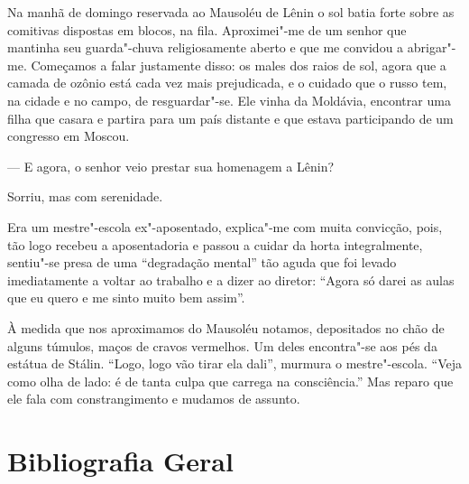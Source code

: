 Na manhã de domingo reservada ao Mausoléu de Lênin o sol batia forte sobre as comitivas dispostas em blocos, na fila. Aproximei"-me de um senhor que mantinha seu guarda"-chuva religiosamente aberto e que me convidou a abrigar"-me. Começamos a falar justamente disso: os males dos raios de sol, agora que a camada de ozônio está cada vez mais prejudicada, e o cuidado que o russo tem, na cidade e no campo, de resguardar"-se. Ele vinha da Moldávia, encontrar uma filha que casara e partira para um país distante e que estava participando de um congresso em Moscou.

--- E agora, o senhor veio prestar sua homenagem a Lênin?

Sorriu, mas com serenidade.

Era um mestre"-escola ex"-aposentado, explica"-me com muita convicção, pois, tão logo recebeu a aposentadoria e passou a cuidar da horta integralmente, sentiu"-se presa de uma ``degradação mental'' tão aguda que foi levado imediatamente a voltar ao trabalho e a dizer ao diretor: ``Agora só darei as aulas que eu quero e me sinto muito bem assim''.

À medida que nos aproximamos do Mausoléu notamos, depositados no chão de alguns túmulos, maços de cravos vermelhos. Um deles encontra"-se aos pés da estátua de Stálin. ``Logo, logo vão tirar ela dali'', murmura o mestre"-escola. ``Veja como olha de lado: é de tanta culpa que carrega na consciência.'' Mas reparo que ele fala com constrangimento e mudamos de assunto.

\pagebreak

\section{\MakeUppercase{B}ibliografia \MakeUppercase{G}eral}
\label{bibliografia}

